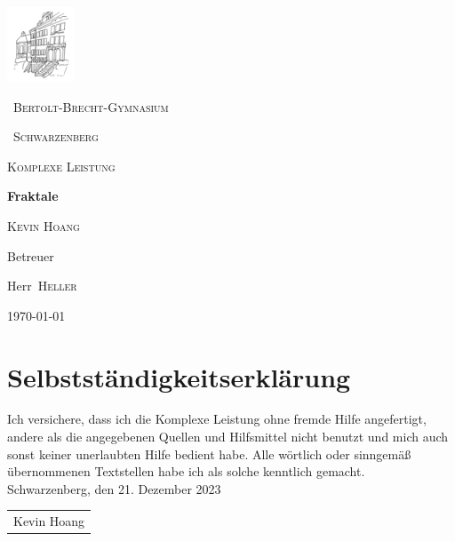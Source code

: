 \documentclass[12pt,a4paper]{report}
\begin{document}
\begin{titlepage}
	\centering
	\includegraphics[width=0.15\textwidth]{logo.png}\par\vspace{1cm}
	{\scshape\ Bertolt-Brecht-Gymnasium \par}
	{\scshape\ Schwarzenberg \par}
	\vspace{1cm}
	{\scshape\Large Komplexe Leistung\par}
	\vspace{1.5cm}
	{\huge\bfseries Fraktale\par}
	\vspace{2cm}
	{\Large\textsc{Kevin Hoang}\par}
	\vfill
	Betreuer \par
	Herr~\textsc{Heller} \vfill
	{\large \today\par}
\end{titlepage}

\tableofcontents






\chapter*{Selbstständigkeitserklärung}

Ich versichere, dass ich die Komplexe Leistung ohne fremde Hilfe angefertigt, andere als die angegebenen Quellen und Hilfsmittel nicht benutzt und mich auch sonst keiner unerlaubten Hilfe bedient habe. Alle wörtlich oder sinngemäß übernommenen Textstellen habe ich als solche kenntlich gemacht.
\\[2ex]
Schwarzenberg, den 21. Dezember 2023
\flushleft
\newlength\us
\settowidth{\us}{-Kevin Hoang-}
\vspace{1cm}
\begin{tabular}{p{\us}}\hline
\centering\footnotesize Kevin Hoang
\end{tabular}
\end{document}
